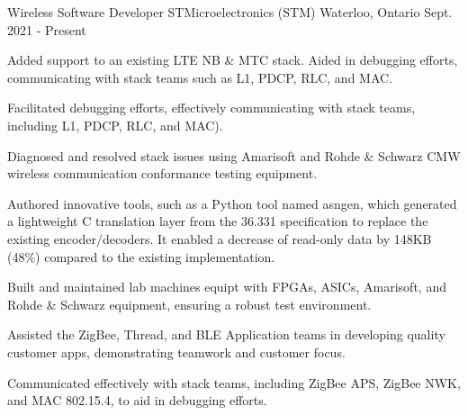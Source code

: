 
\begin{cventries}

  \cventry
    {Wireless Software Developer} %
    {STMicroelectronics (STM)} %
    {Waterloo, Ontario} %
    {Sept. 2021 - Present} %
    {
      \begin{cvitems} %
        \item {Added support to an existing LTE NB \& MTC stack. Aided in debugging efforts, communicating with stack teams such as L1, PDCP, RLC, and MAC.}
        \item {Facilitated debugging efforts, effectively communicating with stack teams, including L1, PDCP, RLC, and MAC).}
        \item {Diagnosed and resolved stack issues using Amarisoft and Rohde \& Schwarz CMW wireless communication conformance testing equipment.}
        \item {Authored innovative tools, such as a Python tool named asngen, which generated a lightweight C translation layer from the 36.331 specification to replace the existing encoder/decoders. It enabled a decrease of read-only data by 148KB (48\%) compared to the existing implementation.}
        \item {Built and maintained lab machines equipt with FPGAs, ASICs, Amarisoft, and Rohde \& Schwarz equipment, ensuring a robust test environment.}
        \item {Assisted the ZigBee, Thread, and BLE Application teams in developing quality customer apps, demonstrating teamwork and customer focus.}
        \item {Communicated effectively with stack teams, including ZigBee APS, ZigBee NWK, and MAC 802.15.4, to aid in debugging efforts.}
      \end{cvitems}
    }


\end{cventries}
